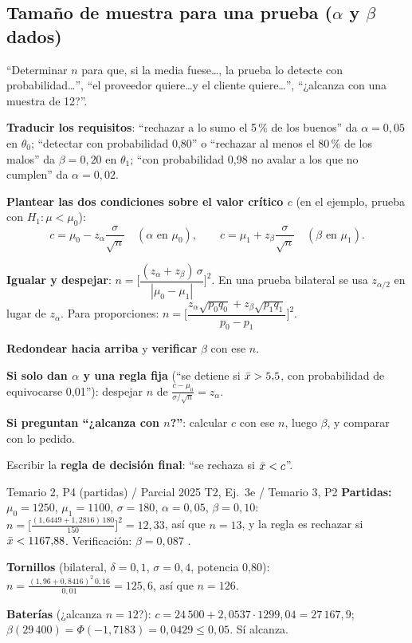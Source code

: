 \subsection{Tamaño de muestra para una prueba ($\alpha$ y $\beta$ dados)}\label{p:nprueba}
\begin{cuando}
``Determinar $n$ para que, si la media fuese\ldots, la prueba lo detecte con probabilidad\ldots'', ``el proveedor quiere\ldots y el cliente quiere\ldots'', ``¿alcanza con una muestra de 12?''.
\end{cuando}
\begin{pasos}
\begin{pasolista}
\item \textbf{Traducir los requisitos}: ``rechazar a lo sumo el 5\,\% de los buenos'' da $\alpha=0{,}05$ en $\theta_0$; ``detectar con probabilidad 0,80'' o ``rechazar al menos el 80\,\% de los malos'' da $\beta=0{,}20$ en $\theta_1$; ``con probabilidad 0,98 no avalar a los que no cumplen'' da $\alpha=0{,}02$.
\item \textbf{Plantear las dos condiciones sobre el valor crítico $c$} (en el ejemplo, prueba con $H_1:\mu<\mu_0$):
\[
c=\mu_0-z_\alpha\frac{\sigma}{\sqrt n}\quad(\alpha\text{ en }\mu_0),\qquad c=\mu_1+z_\beta\frac{\sigma}{\sqrt n}\quad(\beta\text{ en }\mu_1).
\]
\item \textbf{Igualar y despejar}: $n=\Big[\dfrac{(z_\alpha+z_\beta)\,\sigma}{|\mu_0-\mu_1|}\Big]^2$. En una prueba bilateral se usa $z_{\alpha/2}$ en lugar de $z_\alpha$. Para proporciones: $n=\Big[\dfrac{z_\alpha\sqrt{p_0q_0}+z_\beta\sqrt{p_1q_1}}{p_0-p_1}\Big]^2$.
\item \textbf{Redondear hacia arriba} y \textbf{verificar} $\beta$ con ese $n$.
\item \textbf{Si solo dan $\alpha$ y una regla fija} (``se detiene si $\bar{x}>5{,}5$, con probabilidad de equivocarse 0,01''): despejar $n$ de $\frac{c-\mu_0}{\sigma/\sqrt n}=z_\alpha$.
\item \textbf{Si preguntan ``¿alcanza con $n$?''}: calcular $c$ con ese $n$, luego $\beta$, y comparar con lo pedido.
\item Escribir la \textbf{regla de decisión final}: ``se rechaza si $\bar{x}<c$''.
\end{pasolista}
\end{pasos}
\begin{modelo}{Temario 2, P4 (partidas) / Parcial 2025 T2, Ej.\ 3e / Temario 3, P2}
\textbf{Partidas:} $\mu_0=1250$, $\mu_1=1100$, $\sigma=180$, $\alpha=0{,}05$, $\beta=0{,}10$: $n=\big[\frac{(1{,}6449+1{,}2816)\,180}{150}\big]^2=12{,}33$, así que $n=13$, y la regla es rechazar si $\bar{x}<1167{,}88$. Verificación: $\beta=0{,}087$ \checkmark.

\textbf{Tornillos} (bilateral, $\delta=0{,}1$, $\sigma=0{,}4$, potencia 0,80): $n=\frac{(1{,}96+0{,}8416)^2\,0{,}16}{0{,}01}=125{,}6$, así que $n=126$.

\textbf{Baterías} (¿alcanza $n=12$?): $c=24\,500+2{,}0537\cdot1299{,}04=27\,167{,}9$; $\beta(29\,400)=\Phi(-1{,}7183)=0{,}0429\le0{,}05$. Sí alcanza.
\end{modelo}
